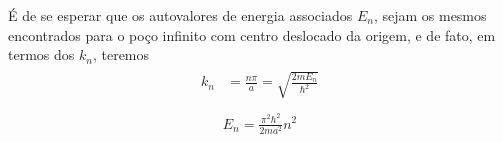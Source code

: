 \begin{prob}
\begin{sol}
		É de se esperar que os autovalores de energia associados $E_{n}$, sejam os mesmos encontrados para o poço infinito com centro deslocado da origem, e de fato, em termos dos $k_{n}$, teremos
		\begin{align}
			\begin{split}
				k_{n} &= \frac{n \pi}{a}=\sqrt{\frac{2mE_{n}}{\hbar^{2}}}\\
			\end{split}
		\end{align}
		\begin{align}
			\boxed{
				E_{n} = \frac{\pi^{2}\hbar^{2}}{2ma^{2}}n^{2}
			}
		\end{align}
	\end{sol}
\end{prob}
